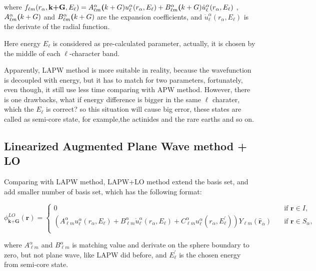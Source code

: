 \documentclass[a4paper, 12pt, titlepage,oneside,drop]{kthesis}
\begin{document}
\noindent where $f_{{\ell}{m}} (r_{\alpha},\textbf{k+G} ,E_{\ell}) =  A _{{\ell}m}^{\alpha} \textbf(k+G) u_{{\ell}}^{\alpha}(r_{\alpha}, E_{\ell}) + B _{{\ell}m}^{\alpha} \textbf(k+G) \dot{u}_{{\ell}}^{\alpha}(r_{\alpha}, E_{\ell})$
, $A _{{\ell}m}^{\alpha} \textbf(k+G)$ and $B _{{\ell}m}^{\alpha} \textbf(k+G)$ are the expansion coefficients, and $\dot{u}_{{\ell}}^{\alpha}(r_{\alpha}, E_{\ell} )$ is the derivate of the radial function.

\noindent Here energy $E_{\ell}$  is considered as pre-calculated parameter, actually, it is chosen by the middle of  each $\ell$-character band.

\noindent Apparently, LAPW method is more suitable in reality, because the wavefunction is decoupled with energy, but it has to match for two parameters,
fortunately, even though, it still use less time comparing with APW method. However, there is one drawbacks, what if energy difference is bigger in the same $ {\ell} $ charater, 
which the $E_{\ell}$ is correct? so this situation will cause big error, these states are called as semi-core state, for example,the actinides and the rare earths and so on.

\subsection{Linearized Augmented Plane Wave method + LO}
Comparing with LAPW method, LAPW+LO method extend the basis set, and add smaller number of basis set, which has the following format:


\begin{equation*}\label{lap1}
\phi^{LO}_\textbf{k+G} (\textbf{r})= 
\begin{cases} 0 & \quad \mbox{if $\textbf{r} \in I, $}
\\
(A _{{\ell}m}^{\alpha}  u_{{\ell}}^{\alpha}(r_{\alpha}, E_{\ell}) + B _{{\ell}m}^{\alpha}  \dot{u}_{{\ell}}^{\alpha}(r_{\alpha}, E_{\ell}) + C _{{\ell}m}^{\alpha}  u_{{\ell}}^{\alpha}(r_{\alpha}, E^{\prime}_{\ell})){Y_{{\ell}m}(\hat{\textbf{r}}_{\alpha})} & \quad \mbox{if $\textbf{r} \in S_\alpha, $}\\ 
\end{cases}
\end{equation*}
 
\noindent where $A _{{\ell}m}^{\alpha}$ and $B _{{\ell}m}^{\alpha}$ is matching value and derivate on the sphere boundary to zero, but not plane wave, like LAPW did before, and $E^{\prime}_{\ell}$ is
the chosen energy from semi-core state.
\end{document}
